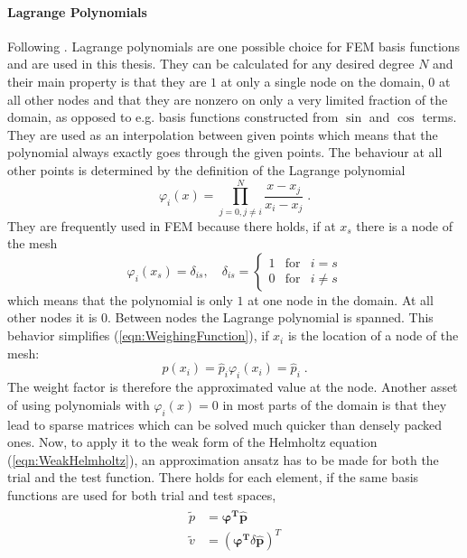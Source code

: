 \documentclass[%
  a4paper,oneside,%
  11pt,%
  smallchapters,
  style=printdev,
  extramargin,
  green,%
  rgb, <cmyk>
  ]{tubsbook}
\begin{document}
\paragraph{Lagrange Polynomials}
Following \cite{langtangen2019}.
Lagrange polynomials are one possible choice for FEM basis functions and are used in this thesis. They can be calculated for any desired degree $N$ and their main property is that they are $1$ at only a single node on the domain, $0$ at all other nodes and that they are nonzero on only a very limited fraction of the domain, as opposed to e.g. basis functions constructed from $\sin$ and $\cos$ terms. They are used as an interpolation between given points which means that the polynomial always exactly goes through the given points. The behaviour at all other points is determined by the definition of the Lagrange polynomial
\begin{equation}
\varphi_i(x) = \prod_{j=0,j\neq i}^N \frac{x-x_j}{x_i-x_j} \;.
\end{equation}
They are frequently used in FEM because there holds, if at $x_s$ there is a node of the mesh 
\begin{equation}
\varphi_i(x_s) = \delta_{is}, \quad \delta_{is}  =     \left\{ \begin{array}{rcl} 1 & \mbox{for}& i = s  \\ 0 & \mbox{for} & i \neq s\end{array}\right .
\end{equation}
which means that the polynomial is only $1$ at one node in the domain. At all other nodes it is $0$. Between nodes the Lagrange polynomial is spanned. This behavior simplifies (\ref{eqn:WeighingFunction}), if $x_i$ is the location of a node of the mesh:
\begin{equation}
p(x_i) = \hat{p}_i \varphi_i(x_i) = \hat{p}_i \;.
\end{equation}
The weight factor is therefore the approximated value at the node.
Another asset of using polynomials with $\varphi_i(x) = 0$ in most parts of the domain is that they lead to sparse matrices which can be solved much quicker than densely packed ones.
%
Now, to apply it to the weak form of the Helmholtz equation (\ref{eqn:WeakHelmholtz}), an approximation ansatz has to be made for both the trial and the test function. There holds for each element, if the same basis functions are used for both trial and test spaces,
\begin{align}
\begin{split}
\tilde{p} &= \bm{\varphi^T} \hat{\bm{p}} \\
\tilde{v} &= (\bm{\varphi^T} \delta\hat{\bm{p}})^T
\end{split}
\label{eqn:FEMAnsatz}
\end{align}
\end{document}
